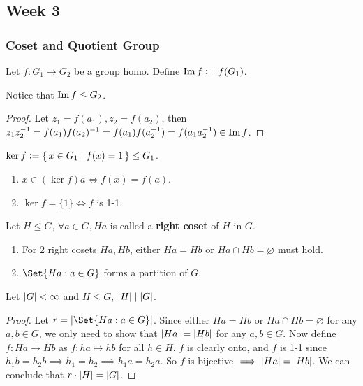 \subsection{Week 3}
\subsubsection{Coset and Quotient Group}
Let $f: G_1 \to G_2$ be a group homo. Define $\operatorname{Im} f \vcentcolon= f(G_1)$.

Notice that $\operatorname{Im} f \le G_2$.
\begin{proof}
  Let $z_1 = f(a_1), z_2 = f(a_2)$, then
  $z_1z_2^{-1} = f(a_1)f(a_2)^{-1} = f(a_1)f(a_2^{-1}) = f(a_1a_2^{-1}) \in
  \operatorname{Im} f$.
\end{proof}

\begin{definition}
  $\ker f \vcentcolon= \{\, x \in G_1 \mid f(x) = 1 \,\} \le G_1$.
\end{definition}

\begin{fact} \mbox{}
  \begin{enumerate}
    \item $x \in (\ker f) a \iff f(x) = f(a)$.
    \item $\ker f = \{ 1 \} \iff f$ is 1-1.
  \end{enumerate}
\end{fact}

\begin{definition}
  Let $H \le G$, $\forall a \in G, Ha$ is called a {\bf right coset} of $H$
  in $G$.
\end{definition}

\begin{fact} \mbox{}
  \begin{enumerate}
    \item For 2 right cosets $Ha, Hb$, either $Ha = Hb$ or $Ha \cap Hb = \varnothing$
      must hold.
    \item $\Set{ Ha : a\in G }$ forms a partition of $G$.
  \end{enumerate}
\end{fact}

\begin{theorem}[Lagrange]
  Let $\lvert G\rvert < \infty$ and $H \le G$, $\lvert H\rvert \mid \lvert G\rvert$.
  \begin{proof}
    Let $r = \abs{\Set{ Ha : a \in G }}$. Since either $Ha = Hb$ or $Ha \cap Hb = \varnothing$
    for any $a, b\in G$, we only need to show that $\lvert Ha\rvert = \lvert Hb\rvert$ for any
    $a, b \in G$.
    Now define $f: Ha \to Hb$ as $f: ha \mapsto hb$ for all $h \in H$.
    $f$ is clearly onto, and $f$ is 1-1 since $h_1b = h_2b \implies h_1 = h_2
    \implies h_1a = h_2a$.
    So $f$ is bijective $\implies \lvert Ha\rvert = \lvert Hb\rvert$.
    We can conclude that $r \cdot \lvert H\rvert = \lvert G\rvert$.
  \end{proof}
\end{theorem}

